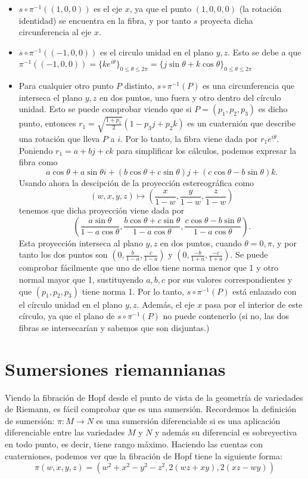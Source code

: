 \documentclass[11pt]{diazessay} %
\begin{document}
\begin{itemize}
    \item $s\circ\pi^{-1}((1,0,0))$ es el eje $x$, ya que el punto $(1,0,0,0)$ (la rotación identidad) se encuentra en la fibra, y por tanto $s$ proyecta dicha circunferencia al eje $x$.
    \item $s\circ\pi^{-1}((-1,0,0))$ es el circulo unidad en el plano $y,z$. Esto se debe a que $\pi^{-1}((-1,0,0))=\{ke^{i\theta}\}_{0\leq\theta\leq 2\pi}=\{j\sin \theta + k\cos \theta\}_{0\leq\theta\leq 2\pi}$
    \item Para cualquier otro punto $P$ distinto, $s\circ\pi^{-1}(P)$ es una circunferencia que interseca el plano $y,z$ en dos puntos, uno fuera y otro dentro del círculo unidad. Esto se puede comprobar viendo que si $P=(p_1,p_2,p_3)$ es dicho punto, entonces $r_1=\sqrt{\frac{1+p_1}{2}}(1-p_3j+p_2k)$ es un cuaternión que describe una rotación que lleva $P$ a $i$. Por lo tanto, la fibra viene dada por $r_1e^{i\theta}$. Poniendo $r_1=a+bj+ck$ para simplificar los cálculos, podemos expresar la fibra como
          \[a\cos\theta + a\sin\theta i + (b\cos\theta + c\sin\theta)j + (c\cos\theta -b\sin\theta)k.\]
          Usando ahora la descipción de la proyección estereográfica como \[(w,x,y,z)\mapsto\left(\frac{x}{1-w},\frac{y}{1-w},\frac{z}{1-w}\right)\]
          tenemos que dicha proyección viene dada por
          \[\left(\frac{a\sin\theta}{1-a\cos\theta},\frac{b\cos\theta+c\sin\theta}{1-a\cos\theta},\frac{c\cos\theta-b\sin\theta}{1-a\cos\theta}\right).\]
          Esta proyección interseca al plano $y,z$ en dos puntos, cuando $\theta=0,\pi$, y por tanto los dos puntos son $(0,\frac{b}{1-a},\frac{c}{1-a})$ y $(0,\frac{-b}{1+a},\frac{-c}{1+a})$. Se puede comprobar fácilmente que uno de ellos tiene norma menor que 1 y otro normal mayor que 1, sustituyendo $a,b,c$ por sus valores correspondientes y que $(p_1,p_2,p_3)$ tiene norma 1. Por lo tanto, $s\circ\pi^{-1}(P)$ está enlazado con el círculo unidad en el plano $y,z$. Además, el eje $x$ pasa por el interior de este círculo, ya que el plano de $s\circ\pi^{-1}(P)$ no puede contenerlo (si no, las dos fibras se intersecarían y sabemos que son disjuntas.)
\end{itemize}

\section*{Sumersiones riemannianas}

Viendo la fibración de Hopf desde el punto de vista de la geometría de variedades de Riemann, es fácil comprobar que es una sumersión. Recordemos la definición de sumersión: $\pi:M\to N$ es una sumersión diferenciable si es una aplicación diferenciable entre las variedades $M$ y $N$ y además su diferencial es sobreyectiva en todo punto, es decir, tiene rango máximo. Haciendo las cuentas con cuaterniones, podemos ver que la fibración de Hopf tiene la siguiente forma:
\[\pi(w,x,y,z) = (w^2 + x^2 - y^2 - z^2, 2(wz + xy), 2(xz - wy))\]
\end{document}
